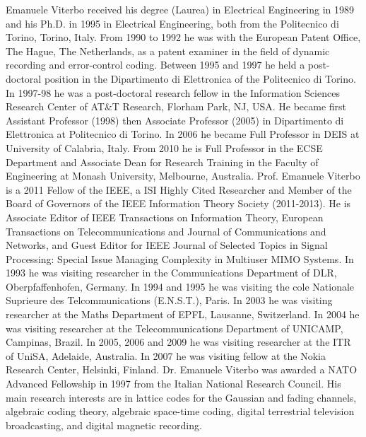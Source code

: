 \documentclass[journal]{IEEEtran}
\begin{document}
\begin{IEEEbiographynophoto}{Emanuele Viterbo}
received his degree (Laurea) in Electrical Engineering
in 1989 and his Ph.D. in 1995 in Electrical Engineering, both from the
Politecnico di Torino, Torino, Italy.  From 1990 to 1992 he was with the
European Patent Office, The Hague, The Netherlands, as a patent examiner
in the field of dynamic recording and error-control coding. Between 1995
and 1997 he held a post-doctoral position in the Dipartimento di
Elettronica of the Politecnico di Torino. In 1997-98 he was a
post-doctoral research fellow in the Information Sciences Research
Center of AT\&T Research, Florham Park, NJ, USA. He became first
Assistant Professor (1998) then Associate Professor (2005) in
Dipartimento di Elettronica at Politecnico di Torino. In 2006 he became
Full Professor in DEIS at University of Calabria, Italy. From 2010 he is
Full Professor in the ECSE Department and Associate Dean for Research
Training in the Faculty of Engineering at Monash University, Melbourne,
Australia.
Prof. Emanuele Viterbo is a 2011 Fellow of the IEEE,  a ISI Highly Cited
Researcher and Member of the Board of Governors of the IEEE Information
Theory Society (2011-2013). He is Associate Editor of IEEE Transactions
on Information Theory, European Transactions on Telecommunications and
Journal of Communications and Networks, and Guest Editor for IEEE
Journal of Selected Topics in Signal Processing: Special Issue Managing
Complexity in Multiuser MIMO Systems.
In 1993 he was visiting researcher in the Communications Department of
DLR, Oberpfaffenhofen, Germany. In 1994 and 1995 he was visiting the
cole Nationale Suprieure des Telcommunications (E.N.S.T.), Paris. In
2003 he was visiting researcher at the Maths Department of EPFL,
Lausanne, Switzerland. In 2004 he was visiting researcher at the
Telecommunications Department of UNICAMP, Campinas, Brazil. In 2005,
2006 and 2009 he was visiting researcher at the ITR of UniSA, Adelaide,
Australia. In 2007 he was visiting fellow at the Nokia Research Center,
Helsinki, Finland.
Dr. Emanuele Viterbo was awarded a NATO Advanced Fellowship in 1997 from
the Italian National Research Council. His main research interests are
in lattice codes for the Gaussian and fading channels, algebraic coding
theory, algebraic space-time coding, digital terrestrial television
broadcasting, and digital magnetic recording.
\end{IEEEbiographynophoto}
\end{document}
